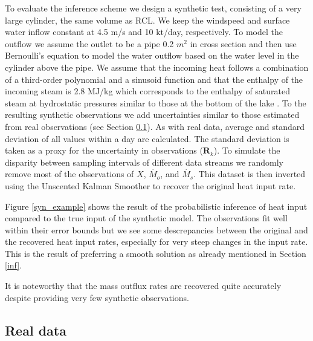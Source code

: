 \documentclass[doublespacing]{bmcart}
\newcommand{\bm}[1]{{\textbf{#1}}}
\begin{document}
To evaluate the inference scheme we design a synthetic test, consisting of a
very large cylinder, the same volume as RCL. We keep the windspeed and surface
water inflow constant at 4.5 m/s and 10 kt/day, respectively. To model the
outflow we assume the outlet to be a pipe 0.2 $m^2$ in cross section and then
use Bernoulli's equation to model the water outflow based on the water level in
the cylinder above the pipe. We assume that the incoming heat follows a
combination of a third-order polynomial and a sinusoid function and that the
enthalpy of the incoming steam is 2.8 MJ/kg which corresponds to the enthalpy of
saturated steam at hydrostatic pressures similar to those at the bottom of the
lake \cite{Mayhew1978}. To the resulting synthetic observations we add
uncertainties similar to those estimated from real observations (see Section
\ref{realdata}). As with real data, average and standard deviation of all values
within a day are calculated. The standard deviation is taken as a proxy for the
uncertainty in observations ($\bm{R}_k$). To simulate the disparity between sampling
intervals of different data streams we randomly remove most of the observations
of $X$, $\dot{M_o}$, and $\dot{M_s}$. This dataset is then inverted using the
Unscented Kalman Smoother to recover the original heat input rate. 

Figure \ref{syn_example} shows the result of the probabilistic inference of heat
input compared to the true input of the synthetic model. The observations fit
well within their error bounds but we see some descrepancies between the
original and the recovered heat input rates, especially for very steep changes
in the input rate. This is the result of preferring a smooth solution as already
mentioned in Section \ref{inf}.

It is noteworthy that the mass outflux rates are recovered quite accurately
despite providing very few synthetic observations.

\subsection{Real data}\label{realdata} 
\end{document}

